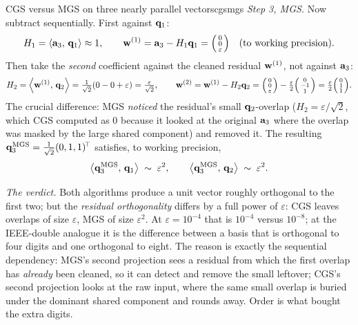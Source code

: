 \begin{workedexample}{CGS versus MGS on three nearly parallel vectors}{cgsmgs}
\smallskip
\emph{Step 3, MGS.} Now subtract sequentially. First against $\mathbf{q}_1$:
\[
  H_1 = \left\langle \mathbf{a}_3,\, \mathbf{q}_1\right\rangle \approx 1, \qquad
  \mathbf{w}^{(1)} = \mathbf{a}_3 - H_1\mathbf{q}_1
    = \begin{psmallmatrix}0\\0\\\varepsilon\end{psmallmatrix}
    \quad(\text{to working precision}).
\]
Then take the \emph{second} coefficient against the cleaned residual $\mathbf{w}^{(1)}$, not
against $\mathbf{a}_3$:
\[
  H_2 = \left\langle \mathbf{w}^{(1)},\, \mathbf{q}_2\right\rangle
      = \tfrac{1}{\sqrt2}(0 - 0 + \varepsilon) = \tfrac{\varepsilon}{\sqrt2},
  \qquad
  \mathbf{w}^{(2)} = \mathbf{w}^{(1)} - H_2\mathbf{q}_2
    = \begin{psmallmatrix}0\\0\\\varepsilon\end{psmallmatrix}
      - \tfrac{\varepsilon}{2}\begin{psmallmatrix}0\\-1\\1\end{psmallmatrix}
    = \tfrac{\varepsilon}{2}\begin{psmallmatrix}0\\1\\1\end{psmallmatrix}.
\]
The crucial difference: MGS \emph{noticed} the residual's small $\mathbf{q}_2$-overlap
($H_2 = \varepsilon/\sqrt2$, which CGS computed as $0$ because it looked at the
original $\mathbf{a}_3$ where the overlap was masked by the large shared component) and
removed it. The resulting $\mathbf{q}_3^{\text{MGS}} = \tfrac{1}{\sqrt2}(0,1,1)^{\!\top}$
satisfies, to working precision,
\[
  \left\langle \mathbf{q}_3^{\text{MGS}},\, \mathbf{q}_1\right\rangle \;\sim\; \varepsilon^2, \qquad
  \left\langle \mathbf{q}_3^{\text{MGS}},\, \mathbf{q}_2\right\rangle \;\sim\; \varepsilon^2 .
\]

\smallskip
\emph{The verdict.} Both algorithms produce a unit vector roughly orthogonal to the
first two; but the \emph{residual orthogonality} differs by a full power of
$\varepsilon$: CGS leaves overlaps of size $\varepsilon$, MGS of size
$\varepsilon^2$. At $\varepsilon = 10^{-4}$ that is $10^{-4}$ versus $10^{-8}$; at the
IEEE-double analogue it is the difference between a basis that is orthogonal to four
digits and one orthogonal to eight. The reason is exactly the sequential dependency:
MGS's second projection sees a residual from which the first overlap has \emph{already}
been cleaned, so it can detect and remove the small leftover; CGS's second projection
looks at the raw input, where the same small overlap is buried under the dominant
shared component and rounds away. Order is what bought the extra digits.
\end{workedexample}

